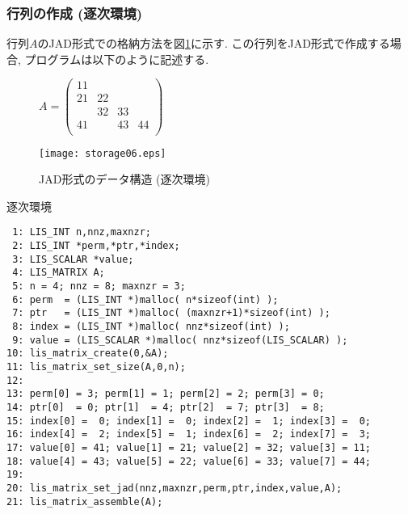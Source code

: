 \documentclass[a4paper]{jarticle}
\begin{document}
{{\subsubsection{行列の作成 (逐次環境)}
行列$A$のJAD形式での格納方法を図\ref{fig:storage06}に示す. 
この行列をJAD形式で作成する場合, プログラムは以下のように記述する. 
\begin{figure}[h]
{\centering 
\begin{minipage}{0.3\textwidth}
\begin{flushright}
$ 
A = \left(
\begin{array}{cccc}
11 &    &    &    \\
21 & 22 &    &    \\
   & 32 & 33 &    \\
41 &    & 43 & 44 \\
\end{array}\right)
$
\end{flushright}
\end{minipage}
\begin{minipage}{0.6\textwidth}
\begin{flushleft}
\texttt{[image: storage06.eps]} 
\end{flushleft}
\end{minipage}
\caption{JAD形式のデータ構造 (逐次環境)}\label{fig:storage06}}
\end{figure}
\begin{itembox}[l]{逐次環境}
\small
\begin{verbatim}
 1: LIS_INT n,nnz,maxnzr;
 2: LIS_INT *perm,*ptr,*index;
 3: LIS_SCALAR *value;
 4: LIS_MATRIX A;
 5: n = 4; nnz = 8; maxnzr = 3;
 6: perm  = (LIS_INT *)malloc( n*sizeof(int) );
 7: ptr   = (LIS_INT *)malloc( (maxnzr+1)*sizeof(int) );
 8: index = (LIS_INT *)malloc( nnz*sizeof(int) );
 9: value = (LIS_SCALAR *)malloc( nnz*sizeof(LIS_SCALAR) );
10: lis_matrix_create(0,&A);
11: lis_matrix_set_size(A,0,n);
12:
13: perm[0] = 3; perm[1] = 1; perm[2] = 2; perm[3] = 0;
14: ptr[0]  = 0; ptr[1]  = 4; ptr[2]  = 7; ptr[3]  = 8;
15: index[0] =  0; index[1] =  0; index[2] =  1; index[3] =  0;
16: index[4] =  2; index[5] =  1; index[6] =  2; index[7] =  3;
17: value[0] = 41; value[1] = 21; value[2] = 32; value[3] = 11;
18: value[4] = 43; value[5] = 22; value[6] = 33; value[7] = 44;
19:
20: lis_matrix_set_jad(nnz,maxnzr,perm,ptr,index,value,A);
21: lis_matrix_assemble(A);
\end{verbatim}
\end{itembox}

\newpage
}}
\end{document}
